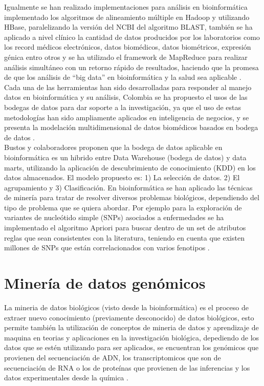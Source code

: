 {Igualmente se han realizado implementaciones para análisis  en bioinformática implementado los algoritmos de alineamiento múltiple en Hadoop  y utilizando HBase, paralelizando la versión del NCBI del algoritmo BLAST, también se ha aplicado a nivel clínico la cantidad de datos producidos por los laboratorios como los record médicos electrónicos, datos biomédicos, datos biométricos, expresión génica entro otros y  se ha utilizado el framework de MapReduce para realizar análisis simultáneo con un retorno rápido de resultados, haciendo que la promesa de que los análisis de “big data”  en bioinformática y la salud sea aplicable \cite{Mohammed2014}.\\

Cada una de las herramientas han sido desarrolladas para responder al manejo datos en bioinformática y su análisis,  Colombia se ha propuesto el usos de las bodegas de datos para dar soporte a la investigación, ya que el uso de estas metodologías han sido ampliamente aplicados en inteligencia de negocios, y se presenta la modelación multidimensional de datos biomédicos basados en bodega de datos \cite{Bustos2007}.\\

Bustos \cite{Bustos2007}  y colaboradores proponen que la bodega de datos aplicable en bioinformática es  un hibrido entre Data Warehouse (bodega de datos) y data marts, utilizando la aplicación de descubrimiento de conocimiento (KDD) en los datos almacenados. El modelo propuesto es: 1) La selección de datos. 2) El agrupamiento y 3) Clasificación. En bioinformática se han aplicado las técnicas de minería para tratar de resolver diversos problemas biológicos, dependiendo del tipo de problema que se quiera abordar. Por ejemplo para la exploración de variantes de nucleótido simple (SNPs) asociados a enfermedades se ha implementado el algoritmo Apriori para buscar dentro de un set de atributos reglas que sean consistentes con la literatura, teniendo en cuenta que existen millones de SNPs que están correlacionados con varios fenotipos \cite{Staccini2014}.

\section{Minería de datos genómicos}

La mineria de datos biológicos (visto desde la bioinformática) es  el proceso de extraer nuevo conocimiento (previamente desconocido) de datos biológicos, esto permite también la utilización de conceptos de mineria de datos y aprendizaje de maquina en teorias y aplicaciones en la investigación biológica, depediendo de los datos que se estén utilizando para ser aplicados, se encuentran los genómicos que provienen del secuenciación de ADN, los transcriptomicos que son de secuenciación de RNA o los de proteínas que provienen de las inferencias y los datos experimentales desde la química \cite{Farid2016}. \\ 

}
